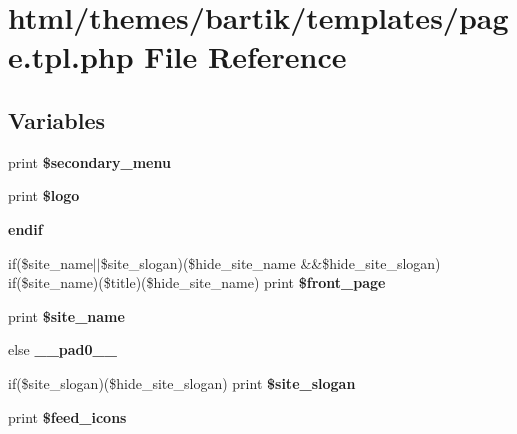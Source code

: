 \hypertarget{themes_2bartik_2templates_2page_8tpl_8php}{
\section{html/themes/bartik/templates/page.tpl.php File Reference}
\label{themes_2bartik_2templates_2page_8tpl_8php}
}
\subsection*{Variables}
\begin{DoxyCompactItemize}
\item 
\hypertarget{themes_2bartik_2templates_2page_8tpl_8php_a466351d4b2da3c2d711e6155a45bbb2a}{
print {\bfseries \$secondary\_\-menu}}
\label{themes_2bartik_2templates_2page_8tpl_8php_a466351d4b2da3c2d711e6155a45bbb2a}

\item 
\hypertarget{themes_2bartik_2templates_2page_8tpl_8php_a0fa695c12e5240657bb07a7742cf8391}{
print {\bfseries \$logo}}
\label{themes_2bartik_2templates_2page_8tpl_8php_a0fa695c12e5240657bb07a7742cf8391}

\item 
\hypertarget{themes_2bartik_2templates_2page_8tpl_8php_a82cd33ca97ff99f2fcc5e9c81d65251b}{
{\bfseries endif}}
\label{themes_2bartik_2templates_2page_8tpl_8php_a82cd33ca97ff99f2fcc5e9c81d65251b}

\item 
\hypertarget{themes_2bartik_2templates_2page_8tpl_8php_aa5f46209c2b5c2478826789ee8cfcdc3}{
if(\$site\_\-name$|$$|$\$site\_\-slogan)(\$hide\_\-site\_\-name \&\&\$hide\_\-site\_\-slogan) if(\$site\_\-name)(\$title)(\$hide\_\-site\_\-name) print {\bfseries \$front\_\-page}}
\label{themes_2bartik_2templates_2page_8tpl_8php_aa5f46209c2b5c2478826789ee8cfcdc3}

\item 
\hypertarget{themes_2bartik_2templates_2page_8tpl_8php_ad500e3900e86a2e78f15afbe44b1f849}{
print {\bfseries \$site\_\-name}}
\label{themes_2bartik_2templates_2page_8tpl_8php_ad500e3900e86a2e78f15afbe44b1f849}

\item 
\hypertarget{themes_2bartik_2templates_2page_8tpl_8php_a8e01dcc96c43199448ee66f7c2ae8ea6}{
else {\bfseries \_\-\_\-pad0\_\-\_\-}}
\label{themes_2bartik_2templates_2page_8tpl_8php_a8e01dcc96c43199448ee66f7c2ae8ea6}

\item 
\hypertarget{themes_2bartik_2templates_2page_8tpl_8php_a66d61f077bc746b3c164c574d28b3b8f}{
if(\$site\_\-slogan)(\$hide\_\-site\_\-slogan) print {\bfseries \$site\_\-slogan}}
\label{themes_2bartik_2templates_2page_8tpl_8php_a66d61f077bc746b3c164c574d28b3b8f}

\item 
\hypertarget{themes_2bartik_2templates_2page_8tpl_8php_ab467b853777a9bfda790f67537c97eca}{
print {\bfseries \$feed\_\-icons}}
\label{themes_2bartik_2templates_2page_8tpl_8php_ab467b853777a9bfda790f67537c97eca}

\end{DoxyCompactItemize}


